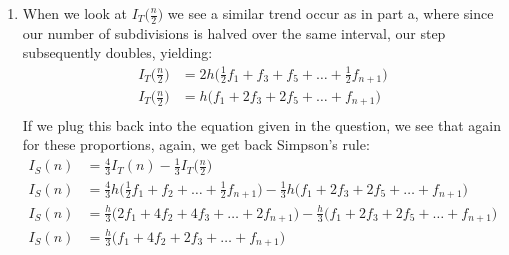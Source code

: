 \documentclass[11pt,a4paper]{article}
\begin{document}
\begin{itemize}
\begin{enumerate} [label={\alph*)}]
					\begin{align*}
						I_S(n) &= \frac{2}{3}I_T(n) + \frac{1}{3}I_M\Big(\frac{n}{2}\Big) \\
						I_S(n) &= \frac{2}{3}h\Big(\frac{1}{2}f_{1} + f_{2}+\dots+\frac{1}{2}f_{n+1}\Big) + \frac{1}{3}2h\Big(f_2 + f_4+\dots\Big) \\
						I_S(n) &= \frac{h}{3}\Big(f_{1} + 2f_{2}+2f_3+\dots+f_{n+1}\Big) + \frac{h}{3}\Big(2f_2 + 2f_4+\dots\Big) \\
						I_S(n) &= \frac{h}{3}\Big(f_{1} + 4f_{2}+2f_3+\dots+f_{n+1}\Big)
					\end{align*}
					\item When we look at $I_T\Big(\frac{n}{2}\Big)$ we see a similar trend occur as in part a, where since our number of subdivisions is halved over the same interval, our step subsequently doubles, yielding:
					\begin{align*}
						I_T\Big(\frac{n}{2}\Big) &= 2h\Big(\frac{1}{2}f_1 + f_3 + f_5 + \dots+\frac{1}{2}f_{n+1}\Big) \\
						I_T\Big(\frac{n}{2}\Big) &= h\Big(f_1 + 2f_3 + 2f_5 + \dots+f_{n+1}\Big) \\
					\end{align*}
					If we plug this back into the equation given in the question, we see that again for these proportions, again, we get back Simpson's rule:
					\begin{align*}
						I_S(n) &= \frac{4}{3}I_T(n) - \frac{1}{3}I_T\Big(\frac{n}{2}\Big) \\
						I_S(n) &= \frac{4}{3}h\Big(\frac{1}{2}f_{1} + f_{2}+\dots+\frac{1}{2}f_{n+1}\Big) - \frac{1}{3}h\Big(f_1 + 2f_3 + 2f_5 + \dots+f_{n+1}\Big) \\
						I_S(n) &= \frac{h}{3}\Big(2f_{1} + 4f_{2}+4f_3+\dots+2f_{n+1}\Big) - \frac{h}{3}\Big(f_1 + 2f_3 + 2f_5 + \dots+f_{n+1}\Big) \\
						I_S(n) &= \frac{h}{3}\Big(f_{1} + 4f_{2}+2f_3+\dots+f_{n+1}\Big)
					\end{align*}
				\end{enumerate}
				

\end{itemize}
\end{document}
